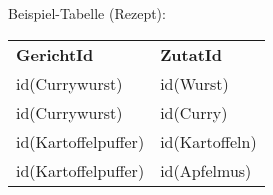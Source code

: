 \noindent
Beispiel-Tabelle (Rezept):\\
\begin{tabular}{ l l }
    \rowcolor{LightSlateGray}
    \textbf{GerichtId}  & \textbf{ZutatId}\\
    id(Currywurst)      & id(Wurst)\\
    id(Currywurst)      & id(Curry)\\
    id(Kartoffelpuffer) & id(Kartoffeln)\\
    id(Kartoffelpuffer) & id(Apfelmus)\\
\end{tabular}



